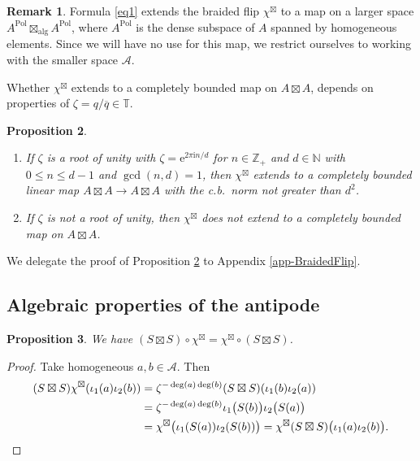 \documentclass[12pt,reqno,a4paper]{amsart}
\newtheorem{proposition}{Proposition}[section]
\theoremstyle{definition}
\newtheorem{remark}[proposition]{Remark}
\newcommand{\comp}{\circ}
\newcommand{\ee}{\mathrm{e}}
\newcommand{\ii}{\mathrm{i}}
\newcommand{\algboxtimes}{\boxtimes_{\textrm{alg}}}
\newcommand{\NN}{\mathbb{N}}
\newcommand{\TT}{\mathbb{T}}
\newcommand{\ZZ}{\mathbb{Z}}
\newcommand{\cA}{\mathscr{A}}
\numberwithin{equation}{section}
\begin{document}
\begin{remark}
Formula \eqref{eq1} extends the braided flip $\chi^{\boxtimes}$ to a map on a larger space $A^{\operatorname{Pol}}\algboxtimes A^{\operatorname{Pol}}$, where $A^{\operatorname{Pol}}$ is the dense subspace of $A$ spanned by homogeneous elements. Since we will have no use for this map, we restrict ourselves to working with the smaller space $\cA$.
\end{remark}

Whether $\chi^\boxtimes$ extends to a completely bounded map on $A\boxtimes A$, depends on properties of $\zeta=q/\overline{q}\in \TT$.

\begin{proposition}\label{prop1}
\noindent
\begin{enumerate}
\item If $\zeta$ is a root of unity with $\zeta=\ee^{2\pi\ii n/d}$ for $n\in\ZZ_+$ and $d\in\NN$ with $0\le n\le d-1$ and $\gcd(n,d)=1$, then $\chi^{\boxtimes}$ extends to a completely bounded linear map $A\boxtimes A\to A\boxtimes A$ with the c.b.~norm not greater than $d^2$.
\item If $\zeta$ is not a root of unity, then $\chi^{\boxtimes}$ does not extend to a completely bounded map on $A\boxtimes A$.
\end{enumerate}
\end{proposition}

We delegate the proof of Proposition \ref{prop1} to Appendix \ref{app-BraidedFlip}.

\subsection{Algebraic properties of the antipode}

\begin{proposition}
We have $(S\boxtimes S)\comp\chi^\boxtimes=\chi^\boxtimes\comp(S\boxtimes S)$.
\end{proposition}

\begin{proof}
Take homogeneous $a,b\in\cA$. Then
\begin{align*}
(S\boxtimes S)\chi^\boxtimes(\iota_1(a)\iota_2(b))
&=\zeta^{-\deg(a)\deg(b)}(S\boxtimes S)(\iota_1(b)\iota_2(a))\\
&=\zeta^{-\deg(a)\deg(b)}\iota_1\bigl(S(b)\bigr)\iota_2\bigl(S(a)\bigr)\\
&=\chi^{\boxtimes}\bigl(\iota_1(S(a))\iota_2(S(b))\bigr)
=\chi^{\boxtimes}(S\boxtimes S)\bigl(\iota_1(a)\iota_2(b)\bigr).\qedhere
\end{align*}
\end{proof}
\end{document}
